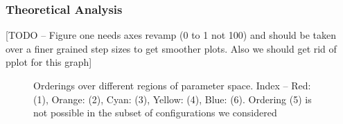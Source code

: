 \documentclass[10pt, preprint]{aastex}
\begin{document}
\subsubsection{Theoretical Analysis}
[TODO -- Figure one needs axes revamp (0 to 1 not 100) and should be taken over a finer grained step sizes to get smoother plots.  Also we should get rid of pplot for this graph]
\begin{figure}
	\centering
	\qquad
	\qquad
	\qquad
	\caption{Orderings over different regions of parameter space. Index -- Red: (1), Orange: (2), Cyan: (3), Yellow: (4), Blue: (6).  Ordering (5) is not possible in the subset of configurations we considered}
\end{figure}
\end{document}

